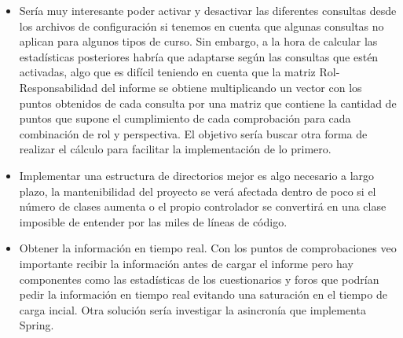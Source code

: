 \begin{itemize}
	\item
	Sería muy interesante poder activar y desactivar las diferentes consultas desde los archivos de configuración si tenemos en cuenta que algunas consultas no aplican para algunos tipos de curso. Sin embargo, a la hora de calcular las estadísticas posteriores habría que adaptarse según las consultas que estén activadas, algo que es difícil teniendo en cuenta que la matriz Rol-Responsabilidad del informe se obtiene multiplicando un vector con los puntos obtenidos de cada consulta por una matriz que contiene la cantidad de puntos que supone el cumplimiento de cada comprobación para cada combinación de rol y perspectiva. El objetivo sería buscar otra forma de realizar el cálculo para facilitar la implementación de lo primero.
	\item
	Implementar una estructura de directorios mejor es algo necesario a largo plazo, la mantenibilidad del proyecto se verá afectada dentro de poco si el número de clases aumenta o el propio controlador se convertirá en una clase imposible de entender por las miles de líneas de código.
	\item
	Obtener la información en tiempo real. Con los puntos de comprobaciones veo importante recibir la información antes de cargar el informe pero hay componentes como las estadísticas de los cuestionarios y foros que podrían pedir la información en tiempo real evitando una saturación en el tiempo de carga incial. Otra solución sería investigar la asincronía que implementa Spring.
\end{itemize}
